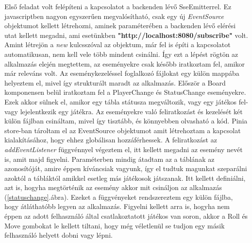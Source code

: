 \documentclass[a4paper,twoside]{article}
\begin{document}
Első feladat volt felépíteni a kapcsolatot a backenden lévő SseEmitterrel. Ez javascriptben nagyon egyszerűen megvalósítható, csak egy új \textit{EventSource} objektumot kellett létrehozni, aminek paraméterében a backenden lévő elérési utat kellett megadni, ami esetünkben \textbf{"http://localhost:8080/subscribe"} volt. Amint létrejön a \textit{new} kulcsszóval az objektum, már fel is építi a kapcsolatot automatikusan, nem kell vele több mindent csinálni. Így ezt a lépést rögtön az alkalmazás elején megtettem, az eseményekre csak később iratkoztam fel, amikor már releváns volt. Az eseménykezeléssel foglalkozó fájlokat egy külön mappába helyeztem el, mivel így strukturált maradt az alkalmazás.
Először a Board komponensen belül iratkoztam fel a PlayerChange és StatusChange eseményekre. Ezek akkor sülnek el, amikor egy tábla státusza megváltozik, vagy egy játékos fel- vagy lejelentkezik egy játékra. Az eseményekre való feliratkozást és kezelését két külön fájlban csináltam, mivel így tisztább, és könnyebben olvasható a kód. Pinia store-ban tároltam el az EventSource objektumot amit létrehoztam a kapcsolat kialakításához, hogy ehhez globálisan hozzáférhessek. A feliratkozást az \textit{addEventListener} függvénnyel végeztem el, itt kellett megadni az esemény nevét is, amit majd figyelni. Paraméterben mindig átadtam az a táblának az azonosítóját, amire éppen kíváncsiak vagyunk, így el tudtuk magunkat szeparálni azoktól a tábláktól amikkel esetleg más játékosok játszanak. Itt kellett definiálni, azt is, hogyha megtörténik az esemény akkor mit csináljon az alkalmazás (\ref{statuschange}.ábra). Ezeket a függvényeket rendszereztem egy külön fájlba, hogy átláthatóbb legyen az alkalmazás. Figyelni kellett arra is, hogyha nem éppen az adott felhasználó által csatlakoztatott játékos van soron, akkor a Roll és Move gombokat le kellett tiltani, hogy még véletlenül se tudjon egy másik felhasználó helyett dobni vagy lépni. 
\end{document}
